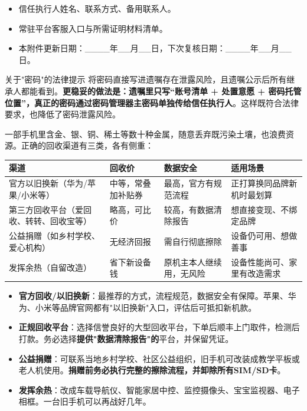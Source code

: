 \begin{itemize}
  \item 信任执行人姓名、联系方式、备用联系人。
  \item 常驻平台客服入口与所需证明材料清单。
  \item 本附件更新日期：\_\_\_\_年\_\_月\_\_日，下次复核日期：\_\_\_\_年\_\_月\_\_日。
\end{itemize}

\begin{tcbwarn}{关于"密码"的法律提示}
将密码直接写进遗嘱存在泄露风险，且遗嘱公示后所有继承人都能看到。\textbf{更稳妥的做法是：遗嘱里只写“账号清单 + 处置意愿 + 密码托管位置”，真正的密码通过密码管理器主密码单独传给信任执行人}。这样既符合法律要求，也降低了密码泄露风险。

\end{tcbwarn}


一部手机里含金、银、铜、稀土等数十种金属，随意丢弃既污染土壤，也浪费资源。正确的回收渠道有三类，各有侧重：

\begin{center}
\begin{tabularx}{\linewidth}{|X|X|X|X|}
\hline
\textbf{渠道} & \textbf{回收价} & \textbf{数据安全} & \textbf{适用场景} \tabularnewline
\hline
官方以旧换新（华为/苹果/小米等） & 中等，常叠加补贴券 & 最高，官方有规范流程 & 正打算换同品牌新机时最划算 \tabularnewline
第三方回收平台（爱回收、转转、回收宝等） & 略高，可比价 & 较高，有数据清除报告 & 想直接变现、不绑定品牌 \tabularnewline
公益捐赠（如乡村学校、爱心机构） & 无经济回报 & 需自行彻底擦除 & 设备仍可用、想做善事 \tabularnewline
发挥余热（自留改造） & 省下新设备钱 & 原机主本人继续用，无风险 & 设备性能尚可、家里有改造需求 \tabularnewline
\hline
\end{tabularx}
\end{center}

\begin{itemize}
  \item \textbf{官方回收/以旧换新}：最推荐的方式，流程规范，数据安全有保障。苹果、华为、小米等品牌官网都有"以旧换新"入口，评估后可抵扣新机款。
  \item \textbf{正规回收平台}：选择信誉良好的大型回收平台，下单后顺丰上门取件，检测后打款。务必选择\textbf{提供"数据清除报告"的}平台，并保留凭证。
  \item \textbf{公益捐赠}：可联系当地乡村学校、社区公益组织，旧手机可改装成教学平板或老人机使用。\textbf{捐赠前务必执行完整的擦除流程，并卸除所有SIM/SD卡}。
  \item \textbf{发挥余热}：改成车载导航仪、智能家居中控、监控摄像头、宝宝监视器、电子相框。一台旧手机可以再战好几年。
\end{itemize}


